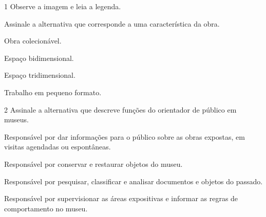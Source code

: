 

\num{1} Observe a imagem e leia a legenda.


Assinale a alternativa que corresponde a uma característica da obra.

\begin{escolha}
\item
  Obra colecionável.
\item
  Espaço bidimensional.
\item
  Espaço tridimensional.
\item
  Trabalho em pequeno formato.
\end{escolha}


\num{2} Assinale a alternativa que descreve funções do orientador de público em museus.

\begin{escolha}
\item
  Responsável por dar informações para o público sobre as obras
  expostas, em visitas agendadas ou espontâneas.
\item
  Responsável por conservar e restaurar objetos do museu.
\item
  Responsável por pesquisar, classificar e analisar documentos e objetos
  do passado.
\item
  Responsável por supervisionar as áreas expositivas e informar as
  regras de comportamento no museu.
\end{escolha}


